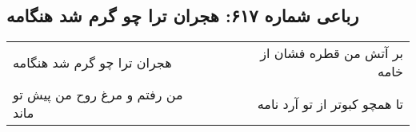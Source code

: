 \begin{center}
\section*{رباعی شماره ۶۱۷: هجران ترا چو گرم شد هنگامه}
\label{sec:sh617}
\begin{longtable}{l p{0.5cm} r}
هجران ترا چو گرم شد هنگامه
&&
بر آتش من قطره فشان از خامه
\\
من رفتم و مرغ روح من پیش تو ماند
&&
تا همچو کبوتر از تو آرد نامه
\\
\end{longtable}
\end{center}
